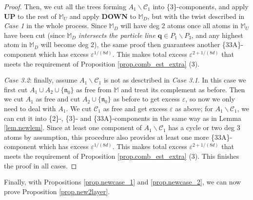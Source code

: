 \documentclass[10pt, reqno]{amsart}
\newcommand{\Mb}{\mathbb M}
\newcommand{\Cc}{\mathcal C}
\newcommand{\nf}{\mathfrak n}
\theoremstyle{definition}
\theoremstyle{remark}
\numberwithin{equation}{section}
\begin{document}
\begin{proof}
Then, we cut all the trees forming $A_1\backslash\Cc_1$ into \{3\}-components, and apply \textbf{UP} to the rest of $\Mb_U$ and apply \textbf{DOWN} to $\Mb_D$, but with the twist described in \emph{Case 1} in the whole process. Since $\Mb_D$ will have deg 2 atoms once all atoms in $\Mb_U$ have been cut (since $\Mb_D$ \emph{intersects the particle line $\boldsymbol{q}\in P_1\backslash P_3$}, and any highest atom in $\Mb_D$ will become deg 2), the same proof then guarantees another \{33A\}-component which has excess $\varepsilon^{1/(8d)}$. This makes total excess $\varepsilon^{2+1/(8d)}$ that meets the requirement of Proposition \ref{prop.comb_est_extra} (3).

\emph{Case 3.2}: finally, assume $A_1\backslash \Cc_1$ is not as desctribed in \emph{Case 3.1}. In this case we first cut $A_1\cup A_2\cup\{\nf_0\}$ as free from $\Mb$ and treat its complement as before. Then we cut $A_1$ as free and cut $A_2\cup\{\nf_0\}$ as before to get excess $\varepsilon$, so now we only need to deal with $A_1$. We cut $\Cc_1$ as free and get excess $\varepsilon$ as above; for $A_1\backslash\Cc_1$, we can cut it into \{2\}-, \{3\}- and \{33A\}-components in the same way as in Lemma \ref{lem.newlem}. Since at least one component of $A_1\backslash\Cc_1$ has a cycle or two deg 3 atoms by assumption, this procedure also provides at least one more \{33A\}-component which has excess $\varepsilon^{1/(8d)}$. This makes total excess $\varepsilon^{2+1/(8d)}$ that meets the requirement of Proposition \ref{prop.comb_est_extra} (3). This finishes the proof in all cases.
\end{proof}
Finally, with Propositions \ref{prop.newcase_1} and \ref{prop.newcase_2}, we can now prove Proposition \ref{prop.new2layer}.
\end{document}
